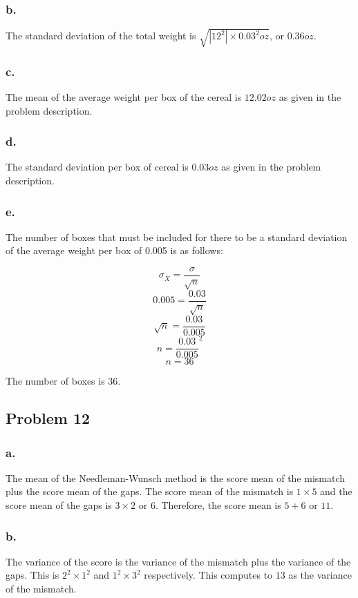 \documentclass[11pt]{article}
\begin{document}
\subsubsection*{b.}
The standard deviation of the total weight is $\sqrt{|12^2|\times 0.03^2 oz}$, or $0.36 oz$.

\subsubsection*{c.}
The mean of the average weight per box of the cereal is $12.02 oz$ as given in the
problem description.

\subsubsection*{d.}
The standard deviation per box of cereal is $0.03 oz$ as given in the problem
description. 

\subsubsection{e.}
The number of boxes that must be included for there to be a standard deviation
of the average weight per box of 0.005 is as follows:

\[ \sigma_{\overline{X}} = \frac{\sigma}{\sqrt{n}} \]
\[ 0.005 = \frac{0.03}{\sqrt{n}} \]
\[ \sqrt{n} = \frac{0.03}{0.005} \]
\[ n = \frac{0.03}{0.005}^2 \]
\[ n = 36 \]

The number of boxes is 36.


\subsection*{Problem 12}
\subsubsection{a.}
The mean of the Needleman-Wunsch method is the score mean of the mismatch plus the
score mean of the gaps. The score mean of the mismatch is $1\times 5$ and the
score mean of the
gaps is $3 \times 2$ or $6$. Therefore, the score mean is $5 + 6$ or $11$. 

\subsubsection{b.}
The variance of the score is the variance of the mismatch plus the variance of
the gaps. This is $2^2\times 1^2$ and $1^2\times 3^2$ respectively. This
computes to $13$ as the variance of the mismatch. 
\end{document}
